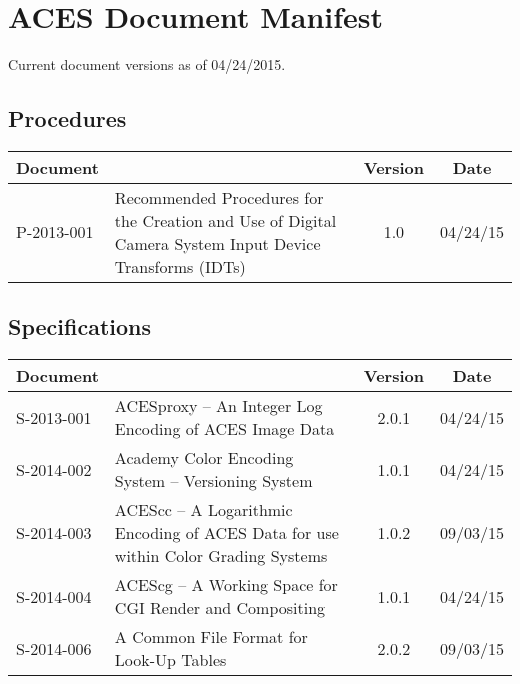 \documentclass[10pt]{academydoc}
\begin{document}
\regularsectionformat

\section*{ACES Document Manifest}
Current document versions as of 04/24/2015.

\subsection*{Procedures}
\begin{tabularx}{\linewidth}{|l X|c|c|}
\hline
\textbf{Document} & & \textbf{Version} & \textbf{Date} \\ \hline
P-2013-001 & Recommended Procedures for the Creation and Use of Digital Camera System Input Device Transforms (IDTs) & 1.0 & 04/24/15 \\ \hline
\end{tabularx}

\subsection*{Specifications}
\begin{tabularx}{\linewidth}{|l X|c|c|}
\hline
\textbf{Document} & & \textbf{Version} & \textbf{Date} \\ \hline
S-2013-001 & ACESproxy -- An Integer Log Encoding of ACES Image Data & 2.0.1 & 04/24/15 \\ \hline
S-2014-002 & Academy Color Encoding System -- Versioning System & 1.0.1 & 04/24/15 \\ \hline
S-2014-003 & ACEScc -- A Logarithmic Encoding of ACES Data for use within Color Grading Systems & 1.0.2 & 09/03/15 \\ \hline
S-2014-004 & ACEScg -- A Working Space for CGI Render and Compositing & 1.0.1 & 04/24/15 \\ \hline
S-2014-006 & A Common File Format for Look-Up Tables & 2.0.2 & 09/03/15 \\ \hline
\end{tabularx}
\end{document}
